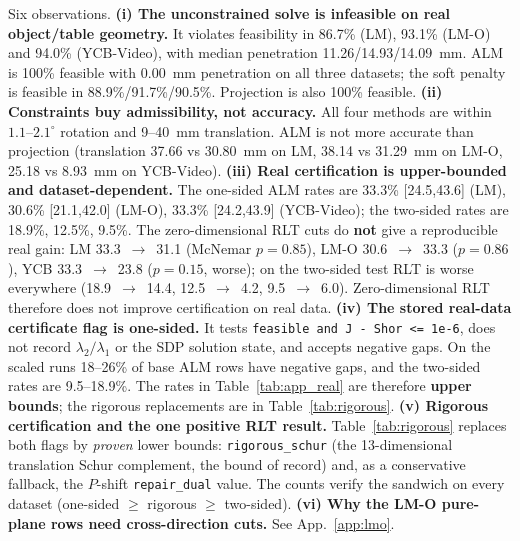 Six observations. \textbf{(i) The unconstrained solve is infeasible on real object/table geometry.} It violates feasibility in 86.7\% (LM), 93.1\% (LM-O) and 94.0\% (YCB-Video), with median penetration 11.26/14.93/14.09~mm. ALM is 100\% feasible with 0.00~mm penetration on all three datasets; the soft penalty is feasible in 88.9\%/91.7\%/90.5\%. Projection is also 100\% feasible. \textbf{(ii) Constraints buy admissibility, not accuracy.} All four methods are within $1.1$--$2.1^\circ$ rotation and 9--40~mm translation. ALM is not more accurate than projection (translation 37.66 vs 30.80~mm on LM, 38.14 vs 31.29~mm on LM-O, 25.18 vs 8.93~mm on YCB-Video). \textbf{(iii) Real certification is upper-bounded and dataset-dependent.} The one-sided ALM rates are 33.3\% [24.5,43.6] (LM), 30.6\% [21.1,42.0] (LM-O), 33.3\% [24.2,43.9] (YCB-Video); the two-sided rates are 18.9\%, 12.5\%, 9.5\%. The zero-dimensional RLT cuts do \textbf{not} give a reproducible real gain: LM 33.3~$\to$~31.1 (McNemar $p=0.85$), LM-O 30.6~$\to$~33.3 ($p=0.86$), YCB 33.3~$\to$~23.8 ($p=0.15$, worse); on the two-sided test RLT is worse everywhere (18.9~$\to$~14.4, 12.5~$\to$~4.2, 9.5~$\to$~6.0). Zero-dimensional RLT therefore does not improve certification on real data. \textbf{(iv) The stored real-data certificate flag is one-sided.} It tests \texttt{feasible and J - Shor <= 1e-6}, does not record $\lambda_2/\lambda_1$ or the SDP solution state, and accepts negative gaps. On the scaled runs 18--26\% of base ALM rows have negative gaps, and the two-sided rates are 9.5--18.9\%. The rates in Table~\ref{tab:app_real} are therefore \textbf{upper bounds}; the rigorous replacements are in Table~\ref{tab:rigorous}. \textbf{(v) Rigorous certification and the one positive RLT result.} Table~\ref{tab:rigorous} replaces both flags by \emph{proven} lower bounds: \texttt{rigorous\_schur} (the 13-dimensional translation Schur complement, the bound of record) and, as a conservative fallback, the $P$-shift \texttt{repair\_dual} value. The counts verify the sandwich on every dataset (one-sided $\ge$ rigorous $\ge$ two-sided). \textbf{(vi) Why the LM-O pure-plane rows need cross-direction cuts.} See App.~\ref{app:lmo}.

